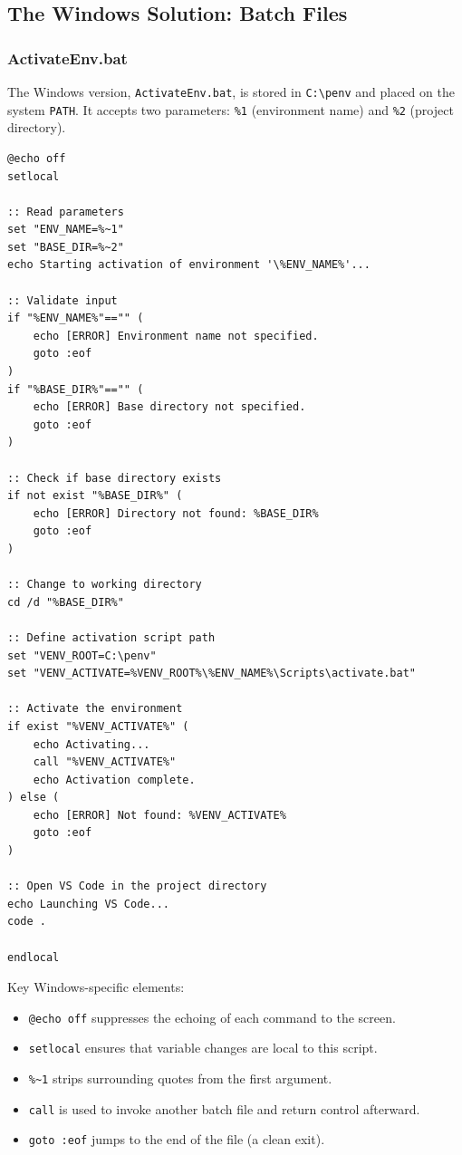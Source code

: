 \subsection{The Windows Solution: Batch Files}

\subsubsection{ActivateEnv.bat}

The Windows version, \texttt{ActivateEnv.bat}, is stored in
\texttt{C:\textbackslash penv} and placed on the system \texttt{PATH}.
It accepts two parameters: \texttt{\%1} (environment name) and
\texttt{\%2} (project directory).

\begin{lstlisting}[style=windowsStyle, basicstyle=\footnotesize\ttfamily, caption={\texttt{ActivateEnv.bat}: Reusable environment launcher (Windows)}]
@echo off
setlocal

:: Read parameters
set "ENV_NAME=%~1"
set "BASE_DIR=%~2"
echo Starting activation of environment '\%ENV_NAME%'...

:: Validate input
if "%ENV_NAME%"=="" (
    echo [ERROR] Environment name not specified.
    goto :eof
)
if "%BASE_DIR%"=="" (
    echo [ERROR] Base directory not specified.
    goto :eof
)

:: Check if base directory exists
if not exist "%BASE_DIR%" (
    echo [ERROR] Directory not found: %BASE_DIR%
    goto :eof
)

:: Change to working directory
cd /d "%BASE_DIR%"

:: Define activation script path
set "VENV_ROOT=C:\penv"
set "VENV_ACTIVATE=%VENV_ROOT%\%ENV_NAME%\Scripts\activate.bat"

:: Activate the environment
if exist "%VENV_ACTIVATE%" (
    echo Activating...
    call "%VENV_ACTIVATE%"
    echo Activation complete.
) else (
    echo [ERROR] Not found: %VENV_ACTIVATE%
    goto :eof
)

:: Open VS Code in the project directory
echo Launching VS Code...
code .

endlocal
\end{lstlisting}


Key Windows-specific elements:
\begin{itemize}
  \item \texttt{@echo off} suppresses the echoing of each command to the
        screen.
  \item \texttt{setlocal} ensures that variable changes are local to this
        script.
  \item \texttt{\%\textasciitilde1} strips surrounding quotes from the first
        argument.
  \item \texttt{call} is used to invoke another batch file and return
        control afterward.
  \item \texttt{goto :eof} jumps to the end of the file (a clean exit).
\end{itemize}

